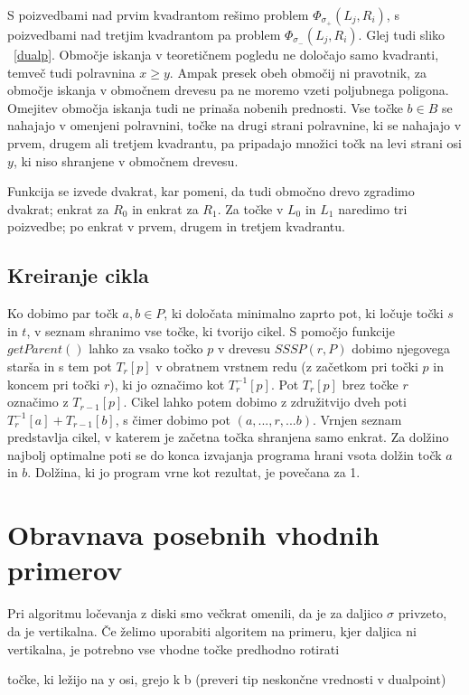 \documentclass[a4paper, 12pt]{book}
\begin{document}
S poizvedbami nad prvim kvadrantom rešimo problem $\Phi_{\sigma_+}(L_j,R_i)$, s poizvedbami nad tretjim kvadrantom pa problem $\Phi_{\sigma_-}(L_j,R_i)$. Glej tudi sliko ~\ref{dualp}. Območje iskanja v teoretičnem pogledu ne določajo samo kvadranti, temveč tudi polravnina $x \geq y$. Ampak presek obeh območij ni pravotnik, za območje iskanja v območnem drevesu pa ne moremo vzeti poljubnega poligona. Omejitev območja iskanja tudi ne prinaša nobenih prednosti. Vse točke $b\in B$ se nahajajo v omenjeni polravnini, točke na drugi strani polravnine, ki se nahajajo v prvem, drugem ali tretjem kvadrantu, pa pripadajo množici točk na levi strani osi $y$, ki niso shranjene v območnem drevesu.

Funkcija se izvede dvakrat, kar pomeni, da tudi območno drevo zgradimo dvakrat; enkrat za $R_0$ in enkrat za $R_1$. Za točke v $L_0$ in $L_1$ naredimo tri poizvedbe; po enkrat v prvem, drugem in tretjem kvadrantu.

\subsection{Kreiranje cikla}
Ko dobimo par točk $a, b\in P$, ki določata minimalno zaprto pot, ki ločuje točki $s$ in $t$, v seznam shranimo vse točke, ki tvorijo cikel. S pomočjo funkcije $getParent()$ lahko za vsako točko $p$ v drevesu $SSSP(r, P)$ dobimo njegovega starša in s tem pot $T_r[p]$ v obratnem vrstnem redu (z začetkom pri točki $p$ in koncem pri točki $r$), ki jo označimo kot $T_r^{-1}[p]$. Pot $T_r[p]$ brez točke $r$ označimo z $T_{r-1}[p]$. Cikel lahko potem dobimo z združitvijo dveh poti $T_r^{-1}[a] + T_{r-1}[b]$, s čimer dobimo pot $(a,...,r,...b)$. Vrnjen seznam predstavlja cikel, v katerem je začetna točka shranjena samo enkrat. Za dolžino najbolj optimalne poti se do konca izvajanja programa hrani vsota dolžin točk $a$ in $b$. Dolžina, ki jo program vrne kot rezultat, je povečana za 1.

\section{Obravnava posebnih vhodnih primerov}
Pri algoritmu ločevanja z diski smo večkrat omenili, da je za daljico $\sigma$ privzeto, da je vertikalna. Če želimo uporabiti algoritem na primeru, kjer daljica ni vertikalna, je potrebno vse vhodne točke predhodno rotirati 

točke, ki ležijo na y osi, grejo k b (preveri tip neskončne vrednosti v dualpoint)
\end{document}
